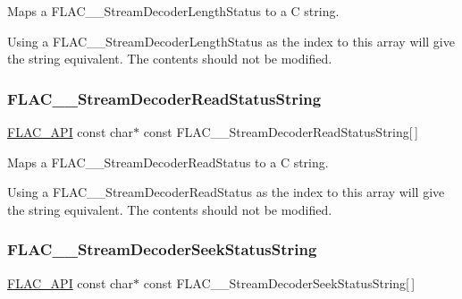 Maps a F\+L\+A\+C\+\_\+\+\_\+\+Stream\+Decoder\+Length\+Status to a C string.

Using a F\+L\+A\+C\+\_\+\+\_\+\+Stream\+Decoder\+Length\+Status as the index to this array will give the string equivalent. The contents should not be modified. \mbox{\label{group__flac__stream__decoder_gadad9526cb960d7d0ac0ca19124d40b2a}} 
\subsubsection{\texorpdfstring{FLAC\_\_StreamDecoderReadStatusString}{FLAC\_\_StreamDecoderReadStatusString}}
{\footnotesize\ttfamily \mbox{\hyperlink{group__flac__export_ga56ca07df8a23310707732b1c0007d6f5}{F\+L\+A\+C\+\_\+\+A\+PI}} const char$\ast$ const F\+L\+A\+C\+\_\+\+\_\+\+Stream\+Decoder\+Read\+Status\+String\mbox{[}$\,$\mbox{]}}

Maps a F\+L\+A\+C\+\_\+\+\_\+\+Stream\+Decoder\+Read\+Status to a C string.

Using a F\+L\+A\+C\+\_\+\+\_\+\+Stream\+Decoder\+Read\+Status as the index to this array will give the string equivalent. The contents should not be modified. \mbox{\label{group__flac__stream__decoder_gac793d777a3d5a63e735415b9bea5b20a}} 
\subsubsection{\texorpdfstring{FLAC\_\_StreamDecoderSeekStatusString}{FLAC\_\_StreamDecoderSeekStatusString}}
{\footnotesize\ttfamily \mbox{\hyperlink{group__flac__export_ga56ca07df8a23310707732b1c0007d6f5}{F\+L\+A\+C\+\_\+\+A\+PI}} const char$\ast$ const F\+L\+A\+C\+\_\+\+\_\+\+Stream\+Decoder\+Seek\+Status\+String\mbox{[}$\,$\mbox{]}}


